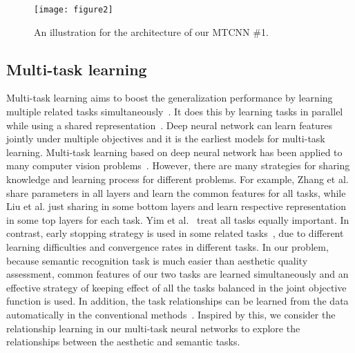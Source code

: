 \documentclass[journal]{IEEEtran}
\begin{document}
\begin{figure*}
  \centering
\texttt{[image: figure2]}\\
\caption{An illustration for the architecture of our MTCNN \#1.}
  \label{fig:MT1}
\end{figure*}
\subsection{Multi-task learning}
Multi-task learning aims to boost the generalization performance by learning multiple related tasks simultaneously~\cite{caruana1997,liu2015multi,zhang2014facial,abdulnabi2015multi}. It does this by learning tasks in parallel while using a shared representation~\cite{caruana1997}. Deep neural network can learn features jointly under multiple objectives and it is the earliest models for multi-task learning. Multi-task learning based on deep neural network has been applied to many computer vision problems~\cite{zhang2014facial,jung2015rotating,zhangshu}. However, there are many strategies for sharing knowledge and learning process for different problems. For example, Zhang et al. \cite{zhang2015deep} share parameters in all layers and learn the common features for all tasks, while Liu et al. \cite{export:241128} just sharing in some bottom layers and learn respective representation in some top layers for each task. Yim et al.~\cite{jung2015rotating} treat all tasks equally important. In contrast, early stopping strategy is used in some related tasks~\cite{zhang2014facial}, due to different learning difficulties and convergence rates in different tasks. In our problem, because semantic recognition task is much easier than aesthetic quality assessment, common features of our two tasks are learned simultaneously and an effective strategy of keeping effect of all the tasks balanced in the joint objective function is used. In addition, the task relationships can be learned from the data automatically in the conventional methods~\cite{zhang2010convex,saha2011online,bonilla2007multi}. Inspired by this, we consider the relationship learning in our multi-task neural networks to explore the relationships between the aesthetic and semantic tasks.
\end{document}
